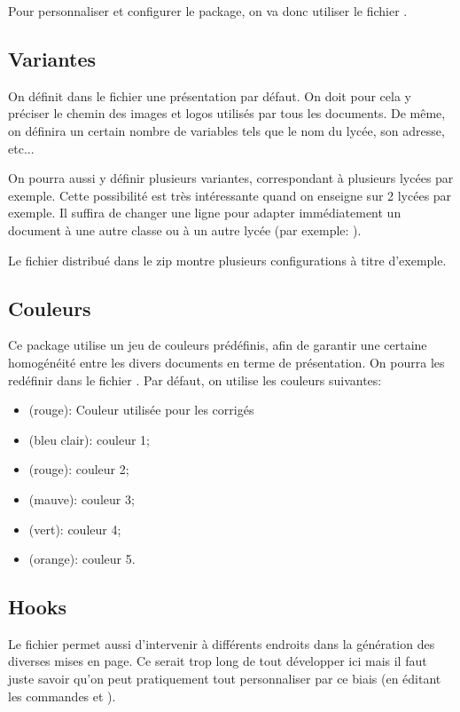 \documentclass[11pt]{article}
\begin{document}
Pour personnaliser et configurer le package, on va donc utiliser le fichier .

\subsection{Variantes}
On définit dans le fichier  une présentation par défaut. On doit pour cela y préciser le chemin des images et logos utilisés par tous les documents. De même, on définira un certain nombre de variables tels que le nom du lycée, son adresse, etc...

On pourra aussi y définir plusieurs variantes, correspondant à plusieurs lycées par exemple. Cette possibilité est très intéressante quand on enseigne sur 2 lycées par exemple. Il suffira de changer une ligne pour adapter immédiatement un document à une autre classe ou à un autre lycée (par exemple: ). 

Le fichier  distribué dans le zip montre plusieurs configurations à titre d'exemple.

\subsection{Couleurs}
Ce package utilise un jeu de couleurs prédéfinis, afin de garantir une certaine homogénéité entre les divers documents en terme de présentation. On pourra les redéfinir dans le fichier . Par défaut, on utilise les couleurs suivantes:

\begin{itemize}
\item {} (rouge): Couleur utilisée pour les corrigés
\item {} (bleu clair): couleur 1;
\item {} (rouge): couleur 2;
\item {} (mauve): couleur 3;
\item {} (vert): couleur 4;
\item {} (orange): couleur 5.
\end{itemize}

\subsection{Hooks}
Le fichier  permet aussi d'intervenir à différents endroits dans la génération des diverses mises en page. Ce serait trop long de tout développer ici mais il faut juste savoir qu'on peut pratiquement tout personnaliser par ce biais (en éditant les commandes  et  ).
\end{document}
